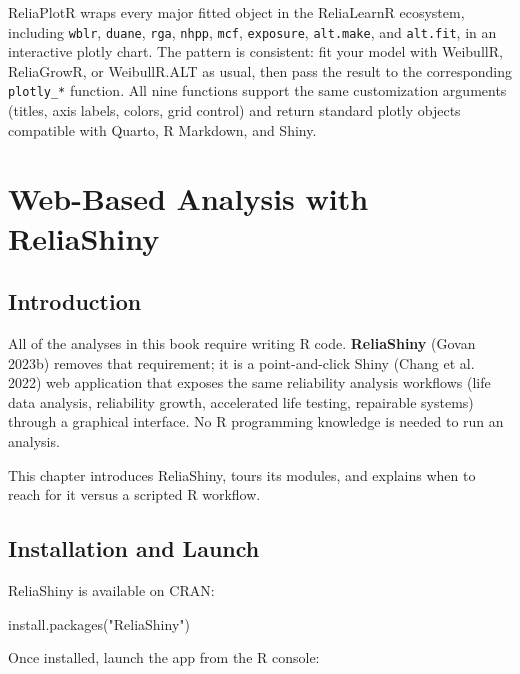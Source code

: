 \documentclass[
  letterpaper,
  DIV=11,
  numbers=noendperiod]{scrreprt}
\newenvironment{Shaded}{\begin{snugshade}}{\end{snugshade}}
\newcommand{\FunctionTok}[1]{\textcolor[rgb]{0.28,0.35,0.67}{#1}}
\newcommand{\NormalTok}[1]{\textcolor[rgb]{0.00,0.23,0.31}{#1}}
\newcommand{\StringTok}[1]{\textcolor[rgb]{0.13,0.47,0.30}{#1}}
\begin{document}
ReliaPlotR wraps every major fitted object in the ReliaLearnR ecosystem,
including \texttt{wblr}, \texttt{duane}, \texttt{rga}, \texttt{nhpp},
\texttt{mcf}, \texttt{exposure}, \texttt{alt.make}, and
\texttt{alt.fit}, in an interactive plotly chart. The pattern is
consistent: fit your model with WeibullR, ReliaGrowR, or WeibullR.ALT as
usual, then pass the result to the corresponding \texttt{plotly\_*}
function. All nine functions support the same customization arguments
(titles, axis labels, colors, grid control) and return standard plotly
objects compatible with Quarto, R Markdown, and Shiny.


\chapter{Web-Based Analysis with ReliaShiny}\label{sec-reliashiny}

\section{Introduction}\label{introduction-7}

All of the analyses in this book require writing R code.
\textbf{ReliaShiny} (Govan 2023b) removes that requirement; it is a
point-and-click Shiny (Chang et al. 2022) web application that exposes
the same reliability analysis workflows (life data analysis, reliability
growth, accelerated life testing, repairable systems) through a
graphical interface. No R programming knowledge is needed to run an
analysis.

This chapter introduces ReliaShiny, tours its modules, and explains when
to reach for it versus a scripted R workflow.

\section{Installation and Launch}\label{installation-and-launch}

ReliaShiny is available on CRAN:

\begin{Shaded}
\begin{Highlighting}[]
\FunctionTok{install.packages}\NormalTok{(}\StringTok{"ReliaShiny"}\NormalTok{)}
\end{Highlighting}
\end{Shaded}

Once installed, launch the app from the R console:
\end{document}
